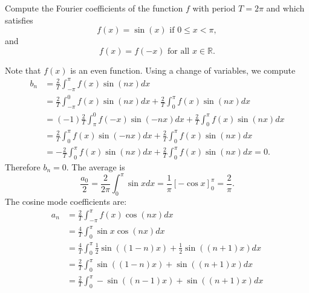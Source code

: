 \documentclass[11pt]{article}
\begin{document}
\begin{exercise}
     Compute the Fourier coefficients of the function $f$ with period $T = 2\pi$ and which satisfies 
     \[
        f(x) = \sin(x) \text{ if } 0 \leq x  < \pi,
     \]
     and 
     \[
        f(x) = f(-x) \text{ for all } x \in \mathbb R.
     \]
\end{exercise}
\begin{solution}     
    Note that $f(x)$ is an even function.
    Using a change of variables, we compute 
    \begin{align*}
        b_n
        &=
        \frac{2}{T}
        \int_{-\pi}^{\pi} f(x) \sin(n x) dx
        \\&
        = 
        \frac{2}{T}
        \int_{-\pi}^{0} f(x) \sin(n x) dx
        +
        \frac{2}{T}
        \int_{0}^{\pi} f(x) \sin(n x) dx
        \\&
        = 
        (-1)
        \frac{2}{T}
        \int_{\pi}^{0} f(-x) \sin( -n x) dx
        +
        \frac{2}{T}
        \int_{0}^{\pi} f(x) \sin(n x) dx
        \\&
        = 
        \frac{2}{T}
        \int_{0}^{\pi} f(x) \sin( -n x) dx
        +
        \frac{2}{T}
        \int_{0}^{\pi} f(x) \sin(n x) dx
        \\&
        = 
        -
        \frac{2}{T}
        \int_{0}^{\pi} f(x) \sin(n x) dx
        +
        \frac{2}{T}
        \int_{0}^{\pi} f(x) \sin(n x) dx
        =
        0
        .
    \end{align*}
    Therefore $b_n = 0$. 
    The average is 
	\[
        \frac{a_0}{2} = \frac{2}{2\pi} \int_{0}^{\pi} \sin x dx  =  \frac{1}{\pi}\left[ - \cos{x} \right]_{0}^{\pi} =\frac{2}{\pi} .
    \]
    The cosine mode coefficients are:
    \begin{align*}
            a_n 
            &
            = 
            \frac{2}{T}
            \int_{-\pi}^{\pi} f(x)   \cos(n x) dx
            \\&
            = 
            \frac{4}{T}
            \int_{0}^{\pi} \sin x \cos(n x) dx
            \\&
            =
            \frac{4}{T}
            \int_{0}^{\pi} \frac 1 2 \sin((1-n)x) + \frac 1 2 \sin((n+1)x) dx
            \\&
            =
            \frac{2}{T}
            \int_{0}^{\pi} \sin((1-n)x) + \sin((n+1)x) dx
            \\&
            =
            \frac{2}{T}
            \int_{0}^{\pi} -\sin((n-1)x) + \sin((n+1)x) dx
            \\&

\end{align*}
\end{solution}
\end{document}
